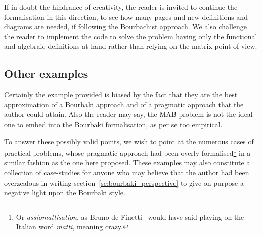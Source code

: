 \documentclass[]{scrartcl}
\theoremstyle{definition}
\begin{document}
If in doubt the hindrance of creativity, the reader is invited to continue the formalisation in this direction, to see how many pages and new definitions and diagrams are needed, if following the Bourbachist approach. We also challenge the reader to implement the code to solve the problem having only the functional and algebraic definitions at hand rather than relying on the matrix point of view.


\subsection*{Other examples}

Certainly the example provided is biased by the fact that they are the best approximation of a Bourbaki approach and of a pragmatic approach that the author could attain. Also the reader may say, the MAB problem is not the ideal one to embed into the Bourbaki formalisation, as per se too empirical.

To answer these possibly valid points, we wish to point at the numerous cases of practical problems, whose pragmatic approach had been overly formalised\footnote{
    Or \emph{assiomattisation}, as Bruno de Finetti~\cite{de2008bruno} would have said playing on the Italian word \emph{matti}, meaning crazy.
} in a similar fashion as the one here proposed. These examples may also constitute a collection of case-studies for anyone who may believe that the author had been overzealous in writing section~\ref{se:bourbaki_perspective} to give on purpose a negative light upon the Bourbaki style.
\end{document}

